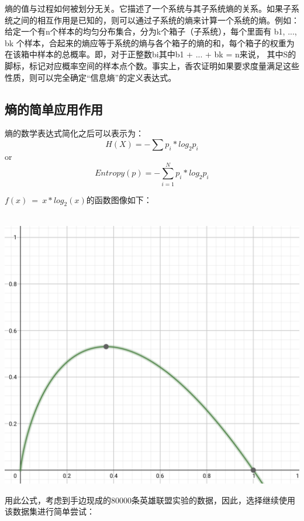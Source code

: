 \documentclass[lang=cn,11pt]{elegantpaper}
\begin{document}
熵的值与过程如何被划分无关。它描述了一个系统与其子系统熵的关系。如果子系统之间的相互作用是已知的，则可以通过子系统的熵来计算一个系统的熵。例如：给定一个有n个样本的均匀分布集合，分为k个箱子（子系统），每个里面有 b1, ..., bk 个样本，合起来的熵应等于系统的熵与各个箱子的熵的和，每个箱子的权重为在该箱中样本的总概率。即，对于正整数bi其中b1 + ... + bk = n来说，
其中S的脚标，标记对应概率空间的样本点个数。事实上，香农证明如果要求度量满足这些性质，则可以完全确定“信息熵”的定义表达式。\cite{李鑫宇0信息熵的来源与应用}

\subsection{熵的简单应用作用}
熵的数学表达式简化之后可以表示为：
\begin{equation}
H(X) = -\sum p_i * log_2 p_i\label{eq:binom}
\end{equation}
or
\begin{equation}
Entropy(p) = -\sum_{i=1}^{N} p_i * log_2 p_i\label{eq:binom}
\end{equation}

$f(x)~=~x*log_2(x)$的函数图像如下：
\\~
\begin{center}
\includegraphics[scale=0.5]{logpic.png}\\
\end{center}

用此公式，考虑到手边现成的80000条英雄联盟实验的数据，因此，选择继续使用该数据集进行简单尝试：
\end{document}

